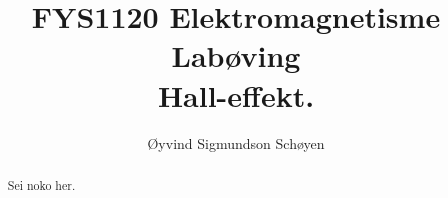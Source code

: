 \documentclass[11pt, a4paper]{article}
\theoremstyle{definition}
\begin{document}
\begin{titlepage}

  \title{\normalsize FYS1120 Elektromagnetisme\\
    \vspace{10mm}
    \huge Labøving\\
    \vspace{10mm}
    \normalsize{\bf Hall-effekt.}}

  \author{Øyvind Sigmundson Schøyen}

\end{titlepage}

\maketitle

\begin{abstract}
  Sei noko her.
\end{abstract}

\newpage
\tableofcontents
\newpage
\end{document}
